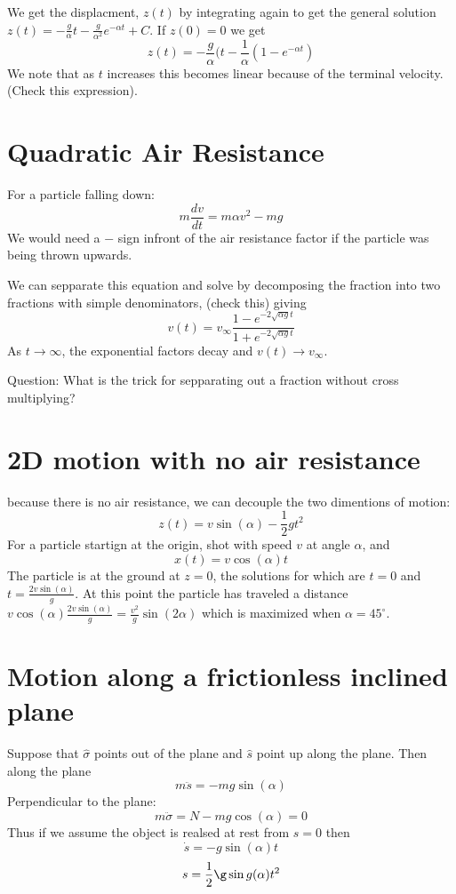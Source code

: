 \documentclass{homework}
\begin{document}
We get the displacment, $z(t)$  by integrating again to get the general solution $z(t) = -\frac{g}{\alpha} t - \frac{g}{\alpha^2}e^{-\alpha t} + C$. If $z(0) = 0$ we get
\[z(t) = -\frac{g}{\alpha}(t - \frac{1}{\alpha}(1 -  e^{-\alpha t})\]
We note that as $t$ increases this becomes linear because of the terminal velocity. (Check this expression).

\section{Quadratic Air Resistance}

For a particle falling down:
\[m\frac{dv}{dt} = m\alpha v^2 - mg\]
We would need a $-$ sign infront of the air resistance factor if the particle was being thrown upwards.

We can sepparate this equation and solve by  decomposing the fraction into two fractions with simple denominators, (check this) giving
\[v(t) = v_{\infty} \frac{1 - e^{-2\sqrt{\alpha g }t}}{1 + e^{-2\sqrt{\alpha g }t}}\]
As $t \rightarrow \infty$, the exponential factors decay and $v(t) \rightarrow v_{\infty}$.

Question: What is the trick for sepparating out a fraction without cross multiplying?


\section{2D motion with no air resistance}

because there is no air resistance, we can decouple the two dimentions of motion:
\[z(t) = v\sin(\alpha)-\frac{1}{2}gt^2\]
For a particle startign at the origin, shot with speed $v$ at angle $\alpha$, and 
\[x(t) = v\cos (\alpha)t\]
The particle is at the ground at $z = 0$, the solutions for which are $t = 0$ and $t = \frac{2v\sin (\alpha )}{g}$. At this point the particle has traveled a distance $v\cos (\alpha ) \frac{2v\sin (\alpha )}{g} = \frac{v^2}{g}\sin (2 \alpha )$ which is maximized when $\alpha = 45^{\circ}$.

\section{Motion along a frictionless inclined plane}

Suppose that $\hat\sigma$ points out of the plane and $\hat s$ point up along the plane. Then along the plane
\[m\ddot s = -mg\sin (\alpha)\]
Perpendicular to the plane:
\[m \ddot {\sigma} = N - mg \cos (\alpha) =0\]
Thus if we assume the object is realsed at rest from $s = 0$ then
\[\dot s = -g \sin (\alpha) t\]
\[s = \frac{1}{2}\g \sin g (\alpha)t^2\]
\end{document}
